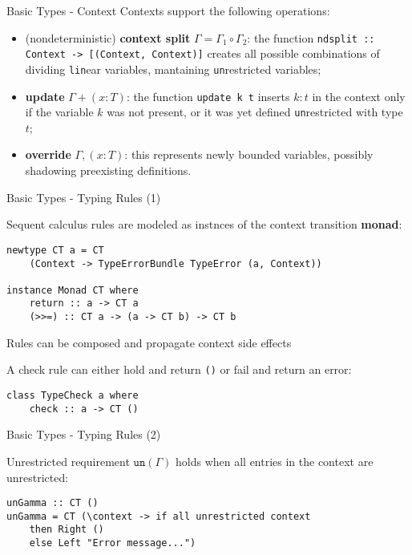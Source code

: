 \begin{frame}[fragile]{Basic Types - Context}
    Contexts support the following operations:
    \begin{itemize}
        \item (nondeterministic) \textbf{context split} $\Gamma = \Gamma_1 \circ \Gamma_2$: the function \texttt{ndsplit :: Context -> [(Context, Context)]} creates all possible combinations of dividing \texttt{lin}ear variables, mantaining \texttt{un}restricted variables;
        \item \textbf{update} $\Gamma + (x : T)$: the function \texttt{update k t} inserts $k : t$ in the context only if the variable $k$ was not present, or it was yet defined \texttt{un}restricted with type $t$;
        \item \textbf{override} $\Gamma, (x : T)$: this represents newly bounded variables, possibly shadowing preexisting definitions.
    \end{itemize}
\end{frame}

\begin{frame}[fragile]{Basic Types - Typing Rules (1)}

    Sequent calculus rules are modeled as instnces of the context transition \textbf{monad}:

    \begin{verbatim}
newtype CT a = CT 
    (Context -> TypeErrorBundle TypeError (a, Context))

instance Monad CT where
    return :: a -> CT a
    (>>=) :: CT a -> (a -> CT b) -> CT b
\end{verbatim}
    Rules can be composed and propagate context side effects

    A check rule can either hold and return \texttt{()} or fail and return an error:
    \begin{verbatim}
class TypeCheck a where
    check :: a -> CT ()
    \end{verbatim}

\end{frame}

\begin{frame}[fragile]{Basic Types - Typing Rules (2)}

    \begin{exampleblock}{Unrestricted requirement}
        $\texttt{un}(\Gamma)$ holds when all entries in the context are unrestricted:
\vspace{0.5cm}
        \begin{verbatim}
unGamma :: CT ()
unGamma = CT (\context -> if all unrestricted context
    then Right ()
    else Left "Error message...")  
        \end{verbatim}
    \end{exampleblock}
\end{frame}

